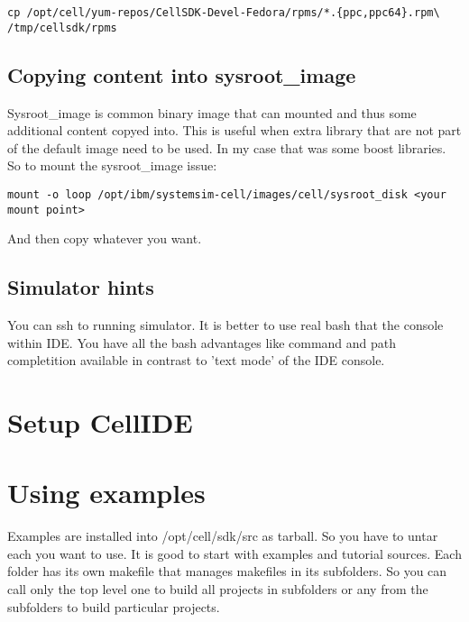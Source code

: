 \begin{verbatim}
cp /opt/cell/yum-repos/CellSDK-Devel-Fedora/rpms/*.{ppc,ppc64}.rpm\
/tmp/cellsdk/rpms
\end{verbatim}

\subsection{Copying content into sysroot\_image}

Sysroot\_image is common binary image that can mounted and thus some additional content copyed into. This is useful when extra library that are not part of the default image need to be used. In my case that was some boost libraries. So to mount the sysroot\_image issue:
\begin{verbatim}
mount -o loop /opt/ibm/systemsim-cell/images/cell/sysroot_disk <your mount point>
\end{verbatim}
And then copy whatever you want.

\subsection{Simulator hints}

\par
You can ssh to running simulator. It is better to use real bash that the console within IDE. You have all the bash advantages like command and path completition available in contrast to 'text mode' of the IDE console.

\section{Setup CellIDE}

\section{Using examples}

Examples are installed into /opt/cell/sdk/src as tarball. So you have to untar each you want to use. It is good to start with examples and tutorial sources. Each folder has its own makefile that manages makefiles in its subfolders. So you can call only the top level one to build all projects in subfolders or any from the subfolders to build particular projects.

